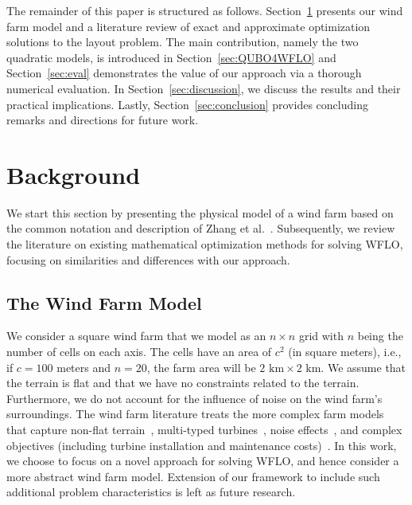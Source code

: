 \documentclass[preprint,12pt]{elsarticle}
\begin{document}
The remainder of this paper is structured as follows. Section~\ref{sec:related} presents our wind farm model and a literature review of exact and approximate
optimization solutions to the layout problem. The main contribution, namely the two quadratic models, is introduced in Section~\ref{sec:QUBO4WFLO} and Section~\ref{sec:eval} demonstrates the value of our approach via a thorough  numerical evaluation.
In Section~\ref{sec:discussion}, we discuss the results and their practical implications.
Lastly, Section~\ref{sec:conclusion} provides concluding remarks and directions for future work.   


\section{Background}
\label{sec:related}

We start this section by presenting the physical model of a wind farm
based on the common
notation and description of Zhang et al.\ \cite{Zhang2014}.  Subsequently,
we review the literature on existing mathematical optimization
methods for solving WFLO, focusing on similarities and
differences with our approach.
 
\subsection{The Wind Farm Model}

We consider a square wind farm that we model as an $n\times n$
grid with $n$ being the number of cells on each axis.  The cells have
an area of $c^2$ (in square meters), i.e., if $c=100$ meters and
$n=20$, the farm area will be $2 \mbox{ km} \times 2 \mbox{ km}$.  We
assume that the terrain is flat and that we have no constraints
related to the terrain.  Furthermore, we do not account for the
influence of noise on the wind farm's surroundings. The wind farm
literature treats the more complex farm models that capture non-flat
terrain~\cite{song2015lazy,kuo2016wind}, multi-typed
turbines~\cite{feng2017design}, noise
effects~\cite{Zhang2014,sorkhabi2016impact,yin2014multi}, and complex
objectives (including turbine installation and maintenance
costs)~\cite{lackner2007analytical,sorkhabi2018constrained}.  In this work, we 
choose to focus on a
novel approach for solving WFLO, and hence consider a more
abstract wind farm model. Extension of our framework to include such additional problem characteristics is left as future research.
 
\end{document}
